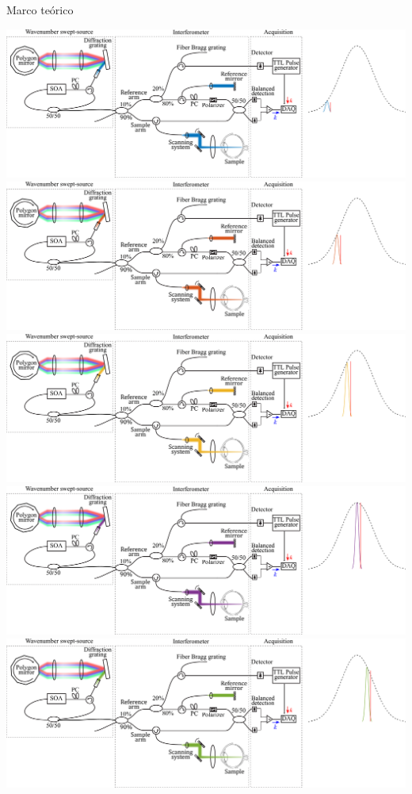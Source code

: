 \documentclass[fleqn,10pt,aspectratio=169,dvipsnames]{beamer}
\begin{document}
\begin{frame}[c]{Marco teórico}{}
	\begin{overprint}
\includegraphics[width=\textwidth]{Figuras/SSOCT_Jitter_1}
\includegraphics[width=\textwidth]{Figuras/SSOCT_Jitter_2}
\includegraphics[width=\textwidth]{Figuras/SSOCT_Jitter_3}
\includegraphics[width=\textwidth]{Figuras/SSOCT_Jitter_4}
\includegraphics[width=\textwidth]{Figuras/SSOCT_Jitter_5}

\end{overprint}
\end{frame}
\end{document}

